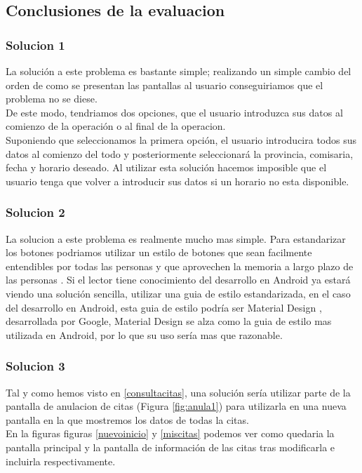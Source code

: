 \documentclass[a4paper,11pt]{article}
\begin{document}
\subsection{Conclusiones de la evaluacion}
\subsubsection{Solucion 1}\label{solucion1}
La solución a este problema es bastante simple; realizando un simple cambio del orden de como se presentan las pantallas al usuario conseguiriamos que el problema no se diese.\\
De este modo, tendriamos dos opciones, que el usuario introduzca sus datos al comienzo de la operación o al final de la operacion. \\
Suponiendo que seleccionamos la primera opción, el usuario introducira todos sus datos al comienzo del todo y posteriormente seleccionará la provincia, comisaria, fecha y horario deseado. Al utilizar esta solución hacemos imposible que el usuario tenga que volver a introducir sus datos si un horario no esta disponible.

\subsubsection{Solucion 2}\label{solucion2}
La solucion a este problema es realmente mucho mas simple. Para estandarizar los botones podriamos utilizar un estilo de botones que sean facilmente entendibles por todas las personas y que aprovechen la memoria a largo plazo de las personas \cite{diapTema2}. Si el lector tiene conocimiento del desarrollo en Android ya estará viendo una solución sencilla, utilizar una guia de estilo estandarizada, en el caso del desarrollo en Android, esta guia de estilo podría ser Material Design \cite{materialdesing}, desarrollada por Google, Material Design se alza como la guia de estilo mas utilizada en Android, por lo que su uso sería mas que razonable.

\subsubsection{Solucion 3}
Tal y como hemos visto en \ref{consultacitas}, una solución sería utilizar parte de la pantalla de anulacion de citas (Figura \ref{fig:anula1}) para utilizarla en una nueva pantalla en la que mostremos los datos de todas la citas.\\
En la figuras figuras \ref{nuevoinicio} y \ref{miscitas} podemos ver como quedaria la pantalla principal y la pantalla de información de las citas tras modificarla e incluirla respectivamente.
\end{document}
